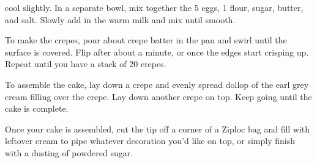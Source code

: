 {{            cool slightly. 
            In a separate bowl, mix together the 5 eggs, 1 \quarter \cup flour, sugar, butter, and salt.
            Slowly add in the warm milk and mix until smooth.
        \item To make the crepes, pour about \quarter \cup crepe batter in the pan and swirl until
            the surface is covered. 
            Flip after about a minute, or once the edges start crisping up.
            Repeat until you have a stack of 20 crepes.
        \item To assemble the cake, lay down a crepe and evenly spread dollop of the earl grey cream
            filling over the crepe. Lay down another crepe on top. Keep going until the cake is complete.
        \item Once your cake is assembled, cut the tip off a corner of a Ziploc bag and fill with
            leftover cream to pipe whatever decoration you’d like on top, or simply finish with a
            dusting of powdered sugar.
    }
}

